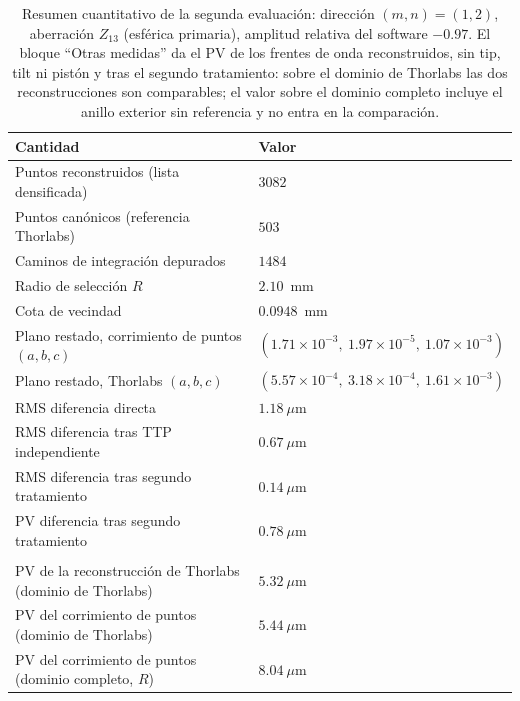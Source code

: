 \documentclass[letterpaper,12pt,oneside]{book}
\begin{document}
\begin{table}[htbp]
\centering
\caption{Resumen cuantitativo de la segunda evaluación: dirección $(m,n)=(1,2)$,
aberración $Z_{13}$ (esférica primaria), amplitud relativa del software $-0.97$. El
bloque ``Otras medidas'' da el PV de los frentes de onda reconstruidos, sin tip, tilt ni
pistón y tras el segundo tratamiento: sobre el dominio de Thorlabs las dos
reconstrucciones son comparables; el valor sobre el dominio completo incluye el anillo
exterior sin referencia y no entra en la comparación.}
\label{tab:cap5-resumen-eval2}
\small
\begin{tabularx}{\textwidth}{>{\raggedright\arraybackslash}Xl}
\hline
\textbf{Cantidad} & \textbf{Valor} \\
\hline
Puntos reconstruidos (lista densificada) & $3082$ \\
Puntos canónicos (referencia Thorlabs)   & $503$ \\
Caminos de integración depurados         & $1484$ \\
Radio de selección $R$                   & $2.10$~mm \\
Cota de vecindad                         & $0.0948$~mm \\
\hline
Plano restado, corrimiento de puntos $(a, b, c)$ & $(1.71\times 10^{-3},\ 1.97\times 10^{-5},\ 1.07\times 10^{-3})$ \\
Plano restado, Thorlabs $(a, b, c)$              & $(5.57\times 10^{-4},\ 3.18\times 10^{-4},\ 1.61\times 10^{-3})$ \\
\hline
RMS diferencia directa                          & $1.18~\mu$m \\
RMS diferencia tras TTP independiente       & $0.67~\mu$m \\
RMS diferencia tras segundo tratamiento     & $0.14~\mu$m \\
PV diferencia tras segundo tratamiento      & $0.78~\mu$m \\
\hline
\multicolumn{2}{l}{\textit{Otras medidas: PV de los frentes de onda reconstruidos}} \\
PV de la reconstrucción de Thorlabs (dominio de Thorlabs) & $5.32~\mu$m \\
PV del corrimiento de puntos (dominio de Thorlabs)        & $5.44~\mu$m \\
PV del corrimiento de puntos (dominio completo, $R$)         & $8.04~\mu$m \\
\hline
\end{tabularx}
\end{table}
\end{document}
